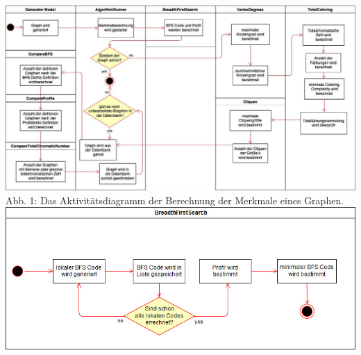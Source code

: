 \documentclass[13pt]{scrreprt}
\begin{document}
\includegraphics[angle = 90, scale = 0.45,center]{Merkmal_Berechnung.jpg}
 Abb. 1: Das Aktivitätsdiagramm der Berechnung der Merkmale eines Graphen.
\includegraphics[scale = 0.75,center]{BFS_Activity.jpg}
\end{document}
